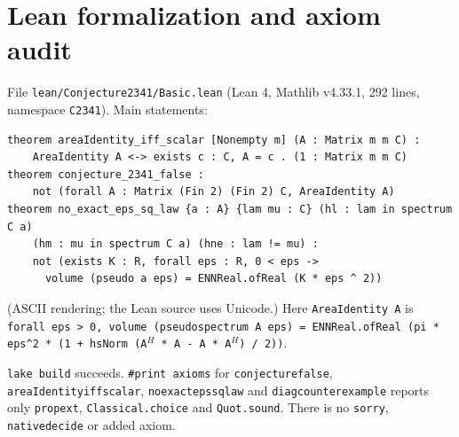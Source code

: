 \documentclass[11pt]{article}
\theoremstyle{definition}
\theoremstyle{remark}
\renewcommand{\_}{\oldus\allowbreak}
\begin{document}
\section{Lean formalization and axiom audit}

File \texttt{lean/Conjecture2341/Basic.lean} (Lean 4, Mathlib v4.33.1, 292 lines, namespace \texttt{C2341}).
Main statements:
\begin{verbatim}
theorem areaIdentity_iff_scalar [Nonempty m] (A : Matrix m m C) :
    AreaIdentity A <-> exists c : C, A = c . (1 : Matrix m m C)
theorem conjecture_2341_false :
    not (forall A : Matrix (Fin 2) (Fin 2) C, AreaIdentity A)
theorem no_exact_eps_sq_law {a : A} {lam mu : C} (hl : lam in spectrum C a)
    (hm : mu in spectrum C a) (hne : lam != mu) :
    not (exists K : R, forall eps : R, 0 < eps ->
      volume (pseudo a eps) = ENNReal.ofReal (K * eps ^ 2))
\end{verbatim}
(ASCII rendering; the Lean source uses Unicode.) Here
\texttt{AreaIdentity A} is
\texttt{forall eps > 0, volume (pseudospectrum A eps) = ENNReal.ofReal (pi * eps\^{}2 * (1 + hsNorm (A$^H$ * A - A * A$^H$) / 2))}.

\texttt{lake build} succeeds. \texttt{\#print axioms} for \texttt{conjecture\_2341\_false},
\texttt{areaIdentity\_iff\_scalar}, \texttt{no\_exact\_eps\_sq\_law} and \texttt{diag\_counterexample} reports
only \texttt{propext}, \texttt{Classical.choice} and \texttt{Quot.sound}. There is no \texttt{sorry},
\texttt{native\_decide} or added axiom.
\end{document}
